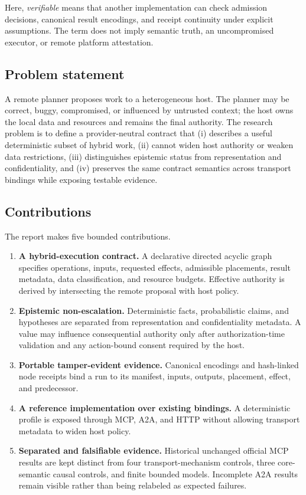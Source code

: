 Here, \emph{verifiable} means that another implementation can check admission decisions, canonical result encodings, and receipt continuity under explicit assumptions. The term does not imply semantic truth, an uncompromised executor, or remote platform attestation.

\subsection{Problem statement}
A remote planner proposes work to a heterogeneous host. The planner may be correct, buggy, compromised, or influenced by untrusted context; the host owns the local data and resources and remains the final authority. The research problem is to define a provider-neutral contract that (i) describes a useful deterministic subset of hybrid work, (ii) cannot widen host authority or weaken data restrictions, (iii) distinguishes epistemic status from representation and confidentiality, and (iv) preserves the same contract semantics across transport bindings while exposing testable evidence.

\subsection{Contributions}
The report makes five bounded contributions.
\begin{enumerate}
  \item \textbf{A hybrid-execution contract.} A declarative directed acyclic graph specifies operations, inputs, requested effects, admissible placements, result metadata, data classification, and resource budgets. Effective authority is derived by intersecting the remote proposal with host policy.
  \item \textbf{Epistemic non-escalation.} Deterministic facts, probabilistic claims, and hypotheses are separated from representation and confidentiality metadata. A value may influence consequential authority only after authorization-time validation and any action-bound consent required by the host.
  \item \textbf{Portable tamper-evident evidence.} Canonical encodings and hash-linked node receipts bind a run to its manifest, inputs, outputs, placement, effect, and predecessor.
  \item \textbf{A reference implementation over existing bindings.} A deterministic \Uzero profile is exposed through MCP, A2A, and HTTP without allowing transport metadata to widen host policy.
  \item \textbf{Separated and falsifiable evidence.} Historical unchanged official MCP results are kept distinct from four transport-mechanism controls, three core-semantic causal controls, and finite bounded models. Incomplete A2A results remain visible rather than being relabeled as expected failures.
\end{enumerate}

